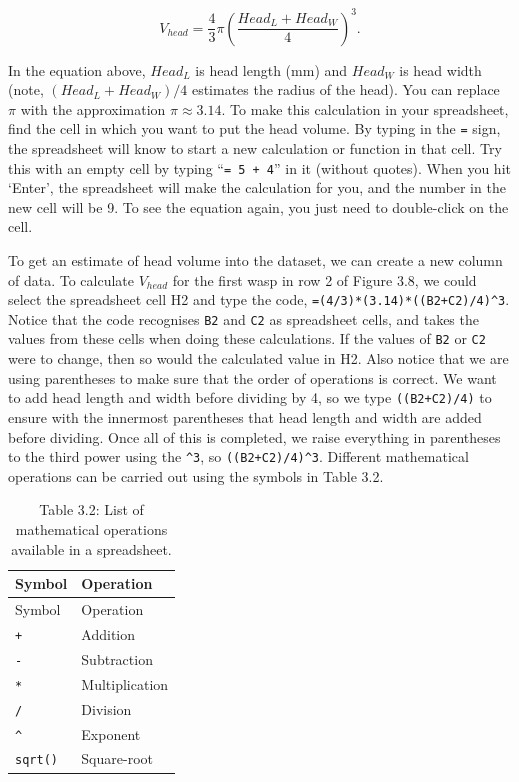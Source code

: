 \documentclass[
]{scrbook}
\begin{document}
\[V_{head} = \frac{4}{3}\pi \left(\frac{Head_L + Head_W}{4}\right)^{3}.\]

In the equation above, \(Head_{L}\) is head length (mm) and \(Head_{W}\) is head width (note, \((Head_L + Head_W)/4\) estimates the radius of the head).
You can replace \(\pi\) with the approximation \(\pi \approx 3.14\).
To make this calculation in your spreadsheet, find the cell in which you want to put the head volume.
By typing in the \texttt{=} sign, the spreadsheet will know to start a new calculation or function in that cell.
Try this with an empty cell by typing ``\texttt{=\ 5\ +\ 4}'' in it (without quotes).
When you hit `Enter', the spreadsheet will make the calculation for you, and the number in the new cell will be 9.
To see the equation again, you just need to double-click on the cell.

To get an estimate of head volume into the dataset, we can create a new column of data.
To calculate \(V_{head}\) for the first wasp in row 2 of Figure 3.8, we could select the spreadsheet cell H2 and type the code, \texttt{=(4/3)*(3.14)*((B2+C2)/4)\^{}3}.
Notice that the code recognises \texttt{B2} and \texttt{C2} as spreadsheet cells, and takes the values from these cells when doing these calculations.
If the values of \texttt{B2} or \texttt{C2} were to change, then so would the calculated value in H2.
Also notice that we are using parentheses to make sure that the order of operations is correct.
We want to add head length and width before dividing by 4, so we type \texttt{((B2+C2)/4)} to ensure with the innermost parentheses that head length and width are added before dividing.
Once all of this is completed, we raise everything in parentheses to the third power using the \texttt{\^{}3}, so \texttt{((B2+C2)/4)\^{}3}.
Different mathematical operations can be carried out using the symbols in Table 3.2.

\begin{longtable}[]{@{}ll@{}}
\caption{Table 3.2: List of mathematical operations available in a spreadsheet.}\tabularnewline
\toprule
Symbol & Operation \\
\midrule
\endfirsthead
\toprule
Symbol & Operation \\
\midrule
\endhead
\texttt{+} & Addition \\
\texttt{-} & Subtraction \\
\texttt{*} & Multiplication \\
\texttt{/} & Division \\
\texttt{\^{}} & Exponent \\
\texttt{sqrt()} & Square-root \\
\bottomrule
\end{longtable}
\end{document}
